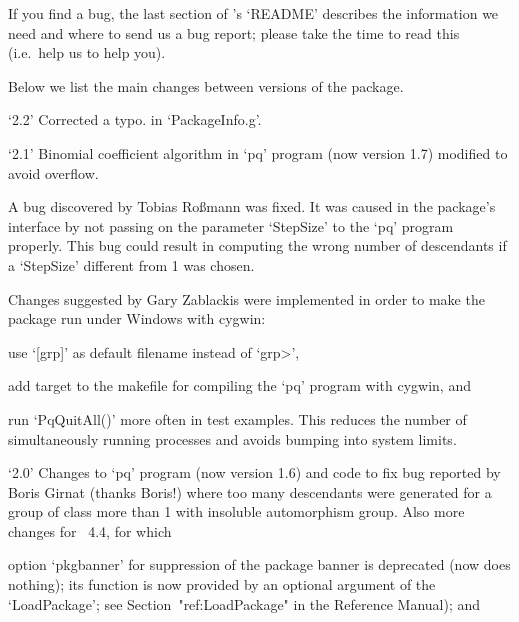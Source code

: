 If you find a bug, the last section of {\ANUPQ}'s `README' describes  the
information we need and where to send us a bug report;  please  take  the
time to read this (i.e.~help us to help you).


Below we list the main changes between versions of the {\ANUPQ} package.

\beginlist

  
\item{`2.2'}
Corrected a typo. in `PackageInfo.g'.

\item{`2.1'}
Binomial coefficient algorithm in `pq' program (now version 1.7) modified
to avoid overflow.

\item{}
A bug discovered by Tobias Ro{\ss}mann was fixed. It was  caused  in  the
{\ANUPQ} package's interface by not passing on the  parameter  `StepSize'
to the `pq' program properly. This bug  could  result  in  computing  the
wrong number of descendants if a `StepSize' different from 1 was chosen.

\item{}
Changes suggested by Gary Zablackis were implemented in order to make the
package run under Windows with cygwin:

\itemitem{--}%
use `[grp]' as default filename instead of `\<grp>',

\itemitem{--}
add target to the makefile for compiling the `pq'  program  with  cygwin,
and

\itemitem{--} 
run `PqQuitAll()' more often in test examples. This reduces the number of
simultaneously running processes and avoids bumping into system limits.

\item{`2.0'}
Changes to `pq' program (now version 1.6) and  {\GAP}  code  to  fix  bug
reported by Boris Girnat (thanks Boris!) where too many descendants  were
generated for a group of class more than 1  with  insoluble  automorphism
group. Also more changes for {\GAP}~4.4, for which

\itemitem{--}%
option `pkgbanner' for suppression of the package  banner  is  deprecated
(now does nothing); its function is now provided by an optional  argument
of  the  `LoadPackage';  see  Section~"ref:LoadPackage"  in  the   {\GAP}
Reference Manual); and

